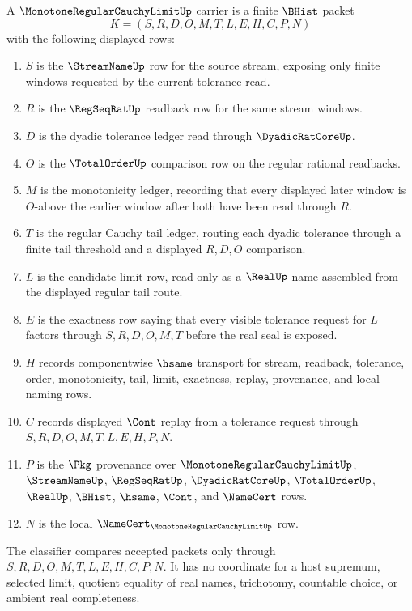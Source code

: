 \begin{definition}
\label{def:monotone-regular-cauchy-limit-carrier}
A $\MonotoneRegularCauchyLimitUp$ carrier is a finite $\BHist$ packet
$$
K=(S,R,D,O,M,T,L,E,H,C,P,N)
$$
with the following displayed rows:
\begin{enumerate}
\item $S$ is the $\StreamNameUp$ row for the source stream, exposing only finite windows requested by the current tolerance read.
\item $R$ is the $\RegSeqRatUp$ readback row for the same stream windows.
\item $D$ is the dyadic tolerance ledger read through $\DyadicRatCoreUp$.
\item $O$ is the $\TotalOrderUp$ comparison row on the regular rational readbacks.
\item $M$ is the monotonicity ledger, recording that every displayed later window is $O$-above the earlier window after both have been read through $R$.
\item $T$ is the regular Cauchy tail ledger, routing each dyadic tolerance through a finite tail threshold and a displayed $R,D,O$ comparison.
\item $L$ is the candidate limit row, read only as a $\RealUp$ name assembled from the displayed regular tail route.
\item $E$ is the exactness row saying that every visible tolerance request for $L$ factors through $S,R,D,O,M,T$ before the real seal is exposed.
\item $H$ records componentwise $\hsame$ transport for stream, readback, tolerance, order, monotonicity, tail, limit, exactness, replay, provenance, and local naming rows.
\item $C$ records displayed $\Cont$ replay from a tolerance request through $S,R,D,O,M,T,L,E,H,P,N$.
\item $P$ is the $\Pkg$ provenance over $\MonotoneRegularCauchyLimitUp$, $\StreamNameUp$, $\RegSeqRatUp$, $\DyadicRatCoreUp$, $\TotalOrderUp$, $\RealUp$, $\BHist$, $\hsame$, $\Cont$, and $\NameCert$ rows.
\item $N$ is the local $\NameCert_{\MonotoneRegularCauchyLimitUp}$ row.
\end{enumerate}
The classifier compares accepted packets only through $S,R,D,O,M,T,L,E,H,C,P,N$. It has no coordinate for a host supremum, selected limit, quotient equality of real names, trichotomy, countable choice, or ambient real completeness.
\end{definition}

